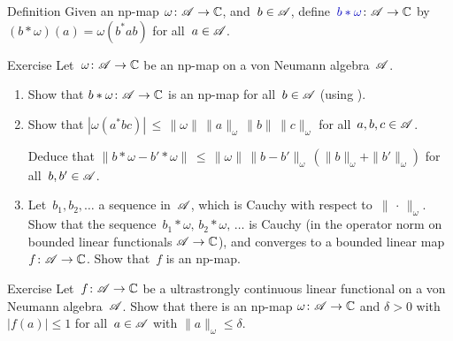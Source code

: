 \documentclass[a]{subfiles}
\begin{document}
\begin{parsec}
\begin{point}[bstaromega]{Definition}
Given an np-map $\omega\colon \mathscr{A}\to\mathbb{C}$,
and~$b\in \mathscr{A}$,
define~$\Define{b*\omega}\colon \scrA\to \C$ by
$(b*\omega)(a)=\omega(b^*ab)$ for all~$a\in \mathscr{A}$.
\end{point}
\begin{point}{Exercise}%
Let~$\omega\colon \mathscr{A}\to \mathbb{C}$ be an np-map on a von Neumann algebra~$\mathscr{A}$.
\begin{enumerate}
\item
Show that $b*\omega\colon \mathscr{A}\to\mathbb{C}$
is an np-map for all~$b\in \mathscr{A}$
(using \TODO{}).
\item
Show that $\left|\omega(a^*bc)\right| 
\,\leq\, \|\omega\|\,\|a\|_\omega\, \|b\|\, \|c\|_\omega$
for all~$a,b,c\in\mathscr{A}$.

Deduce that $\| b*\omega - b'*\omega\|
\,\leq\, \|\omega\| \,\|b-b'\|_\omega\, (\|b\|_\omega + \|b'\|_\omega)$
for all~$b,b'\in\mathscr{A}$.

\item
Let~$b_1,b_2,\dotsc$  a sequence in~$\mathscr{A}$,
which is Cauchy with respect to~$\|\,\cdot\,\|_\omega$.
Show that the sequence~$b_1*\omega,\,b_2*\omega,\,\dotsc$ 
is Cauchy (in the operator norm
on bounded linear functionals $\mathscr{A}\to\mathbb{C}$),
and converges to a bounded linear map~$f\colon \mathscr{A}\to\mathbb{C}$.
Show that~$f$ is an np-map.
\end{enumerate}
\end{point}
\begin{point}{Exercise}%
Let~$f\colon \mathscr{A}\to \mathbb{C}$ be a ultrastrongly continuous linear
functional on a von Neumann algebra~$\mathscr{A}$.
Show that there is an np-map
$\omega\colon \mathscr{A}\to \mathbb{C}$
and $\delta>0$
with $\left|f(a)\right|\leq 1$
for all~$a\in\mathscr{A}$ with $\|a\|_\omega \leq \delta$.


\end{point}
\end{parsec}
\end{document}
